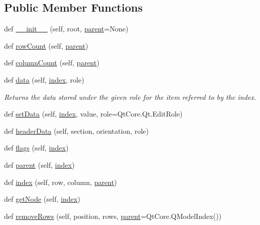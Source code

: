 \subsection*{Public Member Functions}
\begin{DoxyCompactItemize}
\item 
def \hyperlink{a00082_a7961b552537902b9236c2ded9cbfbc63}{\+\_\+\+\_\+init\+\_\+\+\_\+} (self, root, \hyperlink{a00082_afa98c784f58d15bdb49c9ba85854ae03}{parent}=None)
\item 
def \hyperlink{a00082_a44b390eef57be2a4883c1e6599b5a8ca}{row\+Count} (self, \hyperlink{a00082_afa98c784f58d15bdb49c9ba85854ae03}{parent})
\item 
def \hyperlink{a00082_a132b1b7d95f07cae505b40b7fdeb4545}{column\+Count} (self, \hyperlink{a00082_afa98c784f58d15bdb49c9ba85854ae03}{parent})
\item 
def \hyperlink{a00082_a2f7291849d0efb3d7cff499d1cde0bf6}{data} (self, \hyperlink{a00082_a3c52ee6daea1dc2ce7bb23833c761ed2}{index}, role)
\begin{DoxyCompactList}\small\item\em Returns the data stored under the given role for the item referred to by the index. \end{DoxyCompactList}\item 
def \hyperlink{a00082_a9d7790fb94587e15b2c1b77a01e7845c}{set\+Data} (self, \hyperlink{a00082_a3c52ee6daea1dc2ce7bb23833c761ed2}{index}, value, role=Qt\+Core.\+Qt.\+Edit\+Role)
\item 
def \hyperlink{a00082_a6a1656f6697b334ba6112c194cf04611}{header\+Data} (self, section, orientation, role)
\item 
def \hyperlink{a00082_ad60d9395ff571be3fcf12411886f8bcf}{flags} (self, \hyperlink{a00082_a3c52ee6daea1dc2ce7bb23833c761ed2}{index})
\item 
def \hyperlink{a00082_afa98c784f58d15bdb49c9ba85854ae03}{parent} (self, \hyperlink{a00082_a3c52ee6daea1dc2ce7bb23833c761ed2}{index})
\item 
def \hyperlink{a00082_a3c52ee6daea1dc2ce7bb23833c761ed2}{index} (self, row, column, \hyperlink{a00082_afa98c784f58d15bdb49c9ba85854ae03}{parent})
\item 
def \hyperlink{a00082_ad19222ac3eb114c51dce157ae50b2e19}{get\+Node} (self, \hyperlink{a00082_a3c52ee6daea1dc2ce7bb23833c761ed2}{index})
\item 
def \hyperlink{a00082_aa80631169f93be117b17729ae8fa7bf6}{remove\+Rows} (self, position, rows, \hyperlink{a00082_afa98c784f58d15bdb49c9ba85854ae03}{parent}=Qt\+Core.\+Q\+Model\+Index())
\end{DoxyCompactItemize}


